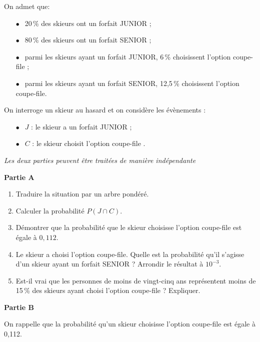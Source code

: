 \documentclass[10pt,a4paper]{article}
\begin{document}
On admet que:
\begin{itemize}
\item[$\bullet~~$] 20\,\% des skieurs ont un forfait JUNIOR ;
\item[$\bullet~~$] 80\,\% des skieurs ont un forfait SENIOR ;
\item[$\bullet~~$] parmi les skieurs ayant un forfait JUNIOR, 6\,\% choisissent l'option coupe-file ;
\item[$\bullet~~$] parmi les skieurs ayant un forfait SENIOR, 12,5\,\% choisissent l'option coupe-file.
\end{itemize}

On interroge un skieur au hasard et on considère les évènements :

\begin{itemize}
\item[$\bullet~~$] $J$ : \og le skieur a un forfait JUNIOR \fg ;
\item[$\bullet~~$] $C$ : \og le skieur choisit l'option coupe-file \fg.
\end{itemize}

\medskip

\emph{Les deux parties peuvent être traitées de manière indépendante}

\bigskip

\textbf{Partie A}

\medskip

\begin{enumerate}
\item Traduire la situation par un arbre pondéré.
\item Calculer la probabilité $P(J \cap C)$.
\item Démontrer que la probabilité que le skieur choisisse l'option coupe-file est égale à $0,112$.
\item Le skieur a choisi l'option coupe-file. Quelle est la probabilité qu'il s'agisse d'un
skieur ayant un forfait SENIOR ? Arrondir le résultat à $10^{-3}$.
\item Est-il vrai que les personnes de moins de vingt-cinq ans représentent moins de 15\,\% des skieurs ayant choisi l'option coupe-file ? Expliquer.
\end{enumerate}

\bigskip

\textbf{Partie B}

\medskip

On rappelle que la probabilité qu'un skieur choisisse l'option coupe-file est égale à 0,112.
\end{document}
